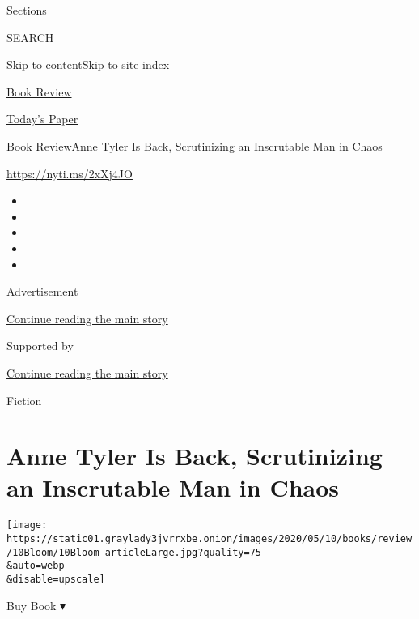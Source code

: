 Sections

SEARCH

\protect\hyperlink{site-content}{Skip to
content}\protect\hyperlink{site-index}{Skip to site index}

\href{https://www.nytimes3xbfgragh.onion/section/books/review}{Book
Review}

\href{https://myaccount.nytimes3xbfgragh.onion/auth/login?response_type=cookie\&client_id=vi}{}

\href{https://www.nytimes3xbfgragh.onion/section/todayspaper}{Today's
Paper}

\href{/section/books/review}{Book Review}\textbar{}Anne Tyler Is Back,
Scrutinizing an Inscrutable Man in Chaos

\url{https://nyti.ms/2xXj4JO}

\begin{itemize}
\item
\item
\item
\item
\item
\end{itemize}

Advertisement

\protect\hyperlink{after-top}{Continue reading the main story}

Supported by

\protect\hyperlink{after-sponsor}{Continue reading the main story}

Fiction

\hypertarget{anne-tyler-is-back-scrutinizing-an-inscrutable-man-in-chaos}{%
\section{Anne Tyler Is Back, Scrutinizing an Inscrutable Man in
Chaos}\label{anne-tyler-is-back-scrutinizing-an-inscrutable-man-in-chaos}}

\texttt{[image: https://static01.graylady3jvrrxbe.onion/images/2020/05/10/books/review/10Bloom/10Bloom-articleLarge.jpg?quality=75\\\&auto=webp\\\&disable=upscale]}

Buy Book ▾

